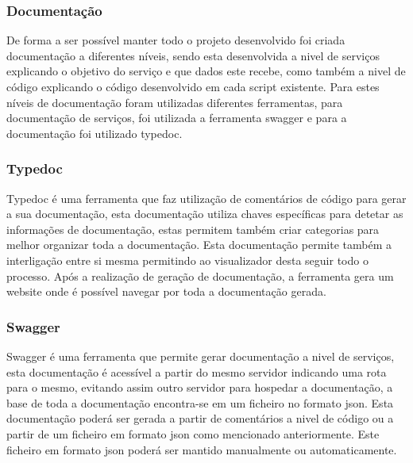 \subsubsection{Documentação}
De forma a ser possível manter todo o projeto desenvolvido foi criada documentação a diferentes níveis, sendo esta desenvolvida a nivel de serviços explicando o objetivo do serviço e que dados este recebe, como também a nivel de código explicando o código desenvolvido em cada script existente. Para estes níveis de documentação foram utilizadas diferentes ferramentas, para documentação de serviços, foi utilizada a ferramenta swagger e para a documentação foi utilizado typedoc.

\subsubsection{Typedoc}
Typedoc é uma ferramenta que faz utilização de comentários de código para gerar a sua documentação, esta documentação utiliza chaves específicas para detetar as informações de documentação, estas permitem também criar categorias para melhor organizar toda a documentação. Esta documentação permite também a interligação entre si mesma permitindo ao visualizador desta seguir todo o processo. Após a realização de geração de documentação, a ferramenta gera um website onde é possível navegar por toda a documentação gerada.

\subsubsection{Swagger}
Swagger é uma ferramenta que permite gerar documentação a nivel de serviços, esta documentação é acessível a partir do mesmo servidor indicando uma rota para o mesmo, evitando assim outro servidor para hospedar a documentação, a base de toda a documentação encontra-se em um ficheiro no formato json. Esta documentação poderá ser gerada a partir de comentários a nivel de código ou a partir de um ficheiro em formato json como mencionado anteriormente. Este ficheiro em formato json poderá ser mantido manualmente ou automaticamente.